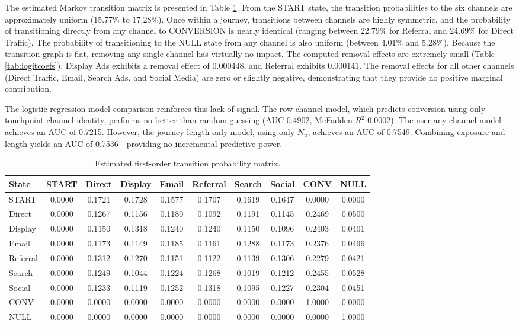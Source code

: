 \documentclass[pdflatex,sn-basic,Numbered]{sn-jnl}
\begin{document}
The estimated Markov transition matrix is presented in Table \ref{tab:transitionmatrix}. From the START state, the transition probabilities to the six channels are approximately uniform (15.77\% to 17.28\%). Once within a journey, transitions between channels are highly symmetric, and the probability of transitioning directly from any channel to CONVERSION is nearly identical (ranging between 22.79\% for Referral and 24.69\% for Direct Traffic). The probability of transitioning to the NULL state from any channel is also uniform (between 4.01\% and 5.28\%). Because the transition graph is flat, removing any single channel has virtually no impact. The computed removal effects are extremely small (Table \ref{tab:logitcoefs}). Display Ads exhibits a removal effect of 0.000448, and Referral exhibits 0.000141. The removal effects for all other channels (Direct Traffic, Email, Search Ads, and Social Media) are zero or slightly negative, demonstrating that they provide no positive marginal contribution.

The logistic regression model comparison reinforces this lack of signal. The row-channel model, which predicts conversion using only touchpoint channel identity, performs no better than random guessing (AUC 0.4902, McFadden $R^2$ 0.0002). The user-any-channel model achieves an AUC of 0.7215. However, the journey-length-only model, using only $N_u$, achieves an AUC of 0.7549. Combining exposure and length yields an AUC of 0.7536—providing no incremental predictive power.

\begin{table}[htbp]
\centering
\caption{Estimated first-order transition probability matrix.}
\label{tab:transitionmatrix}
\begin{small}
\begin{tabular}{l c c c c c c c c c}
\toprule
State & START & Direct & Display & Email & Referral & Search & Social & CONV & NULL \\
\midrule
START & 0.0000 & 0.1721 & 0.1728 & 0.1577 & 0.1707 & 0.1619 & 0.1647 & 0.0000 & 0.0000 \\
Direct & 0.0000 & 0.1267 & 0.1156 & 0.1180 & 0.1092 & 0.1191 & 0.1145 & 0.2469 & 0.0500 \\
Display & 0.0000 & 0.1150 & 0.1318 & 0.1240 & 0.1240 & 0.1150 & 0.1096 & 0.2403 & 0.0401 \\
Email & 0.0000 & 0.1173 & 0.1149 & 0.1185 & 0.1161 & 0.1288 & 0.1173 & 0.2376 & 0.0496 \\
Referral & 0.0000 & 0.1312 & 0.1270 & 0.1151 & 0.1122 & 0.1139 & 0.1306 & 0.2279 & 0.0421 \\
Search & 0.0000 & 0.1249 & 0.1044 & 0.1224 & 0.1268 & 0.1019 & 0.1212 & 0.2455 & 0.0528 \\
Social & 0.0000 & 0.1233 & 0.1119 & 0.1252 & 0.1318 & 0.1095 & 0.1227 & 0.2304 & 0.0451 \\
CONV & 0.0000 & 0.0000 & 0.0000 & 0.0000 & 0.0000 & 0.0000 & 0.0000 & 1.0000 & 0.0000 \\
NULL & 0.0000 & 0.0000 & 0.0000 & 0.0000 & 0.0000 & 0.0000 & 0.0000 & 0.0000 & 1.0000 \\
\bottomrule
\end{tabular}
\end{small}
\end{table}
\end{document}
